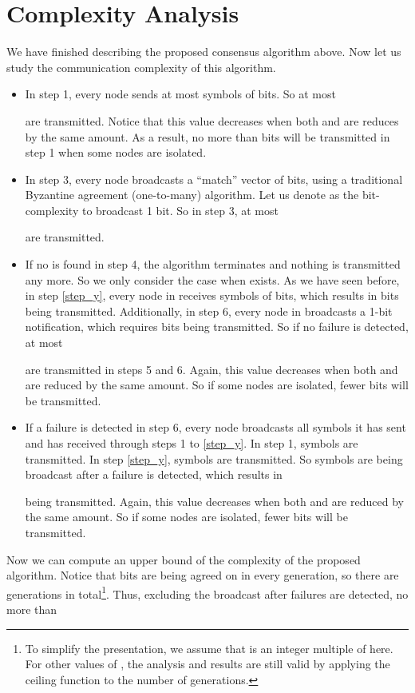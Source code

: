 \documentclass[12pt]{article}
\begin{document}
\section{Complexity Analysis}\label{sec:complexity}
We have finished describing the proposed consensus algorithm above. Now let us study the communication complexity of this algorithm.

\begin{itemize}
\item In step 1, every node sends at most  symbols of  bits. So at most 

are transmitted. Notice that this value decreases when both  and  are reduces by the same amount. As a result, no more than  bits will be transmitted in step 1 when some nodes are isolated.

\item In step 3, every node broadcasts a ``match'' vector of   bits, using a traditional Byzantine agreement (one-to-many) algorithm. Let us denote  as the bit-complexity to broadcast 1 bit. So in step 3, at most

are transmitted.

\item If no  is found in step 4, the algorithm terminates and nothing is transmitted any more. So we only consider the case when  exists. As we have seen before, in step \ref{step_y}, every node in  receives  symbols of  bits, which results in  bits being transmitted. 
Additionally, in step 6, every node in  broadcasts a 1-bit notification, which requires  bits being transmitted. So if no failure is detected, at most

are transmitted in steps 5 and 6. Again, this value decreases when both  and  are reduced by the same amount. So if some nodes are isolated, fewer bits will be transmitted.

\item If a failure is detected in step 6, every node broadcasts all symbols it has sent and has received through steps 1 to \ref{step_y}. In step 1,  symbols are transmitted. In step \ref{step_y},  symbols are transmitted. So  symbols are being broadcast after a failure is detected, which results in 

being transmitted.  Again, this value decreases when both  and  are reduced by the same amount. So if some nodes are isolated, fewer bits will be transmitted.
\end{itemize}

Now we can compute an upper bound of the complexity of the proposed algorithm. Notice that  bits are being agreed on in every generation, so there are  generations in total\footnote{To simplify the presentation, we assume that  is an integer multiple of  here. For other values of , the analysis and results are still valid by applying the ceiling function  to the number of generations.}. Thus, excluding the broadcast after failures are detected, no more than
\end{document}
